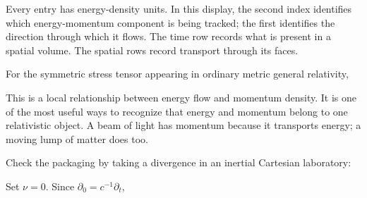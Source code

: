 \documentclass[
  11pt,
  letterpaper,
  oneside,
  openany]{scrbook}
\begin{document}
\begin{center}
\begingroup
{}
\ifdim\wd\grmathbox>\linewidth
\resizebox{\linewidth}{!}{\usebox{\grmathbox}}
\else\usebox{\grmathbox}\fi
\endgroup
\end{center}

Every entry has energy-density units. In this display, the second index
identifies which energy-momentum component is being tracked; the first
identifies the direction through which it flows. The time row records
what is present in a spatial volume. The spatial rows record transport
through its faces.

For the symmetric stress tensor appearing in ordinary metric general
relativity,

\begin{center}
\begingroup
{}
\ifdim\wd\grmathbox>\linewidth
\resizebox{\linewidth}{!}{\usebox{\grmathbox}}
\else\usebox{\grmathbox}\fi
\endgroup
\end{center}

This is a local relationship between energy flow and momentum density.
It is one of the most useful ways to recognize that energy and momentum
belong to one relativistic object. A beam of light has momentum because
it transports energy; a moving lump of matter does too.

Check the packaging by taking a divergence in an inertial Cartesian
laboratory:

\begin{center}
\begingroup
{}
\ifdim\wd\grmathbox>\linewidth
\resizebox{\linewidth}{!}{\usebox{\grmathbox}}
\else\usebox{\grmathbox}\fi
\endgroup
\end{center}

Set \(\nu=0\). Since \(\partial_0=c^{-1}\partial_t\),
\end{document}
